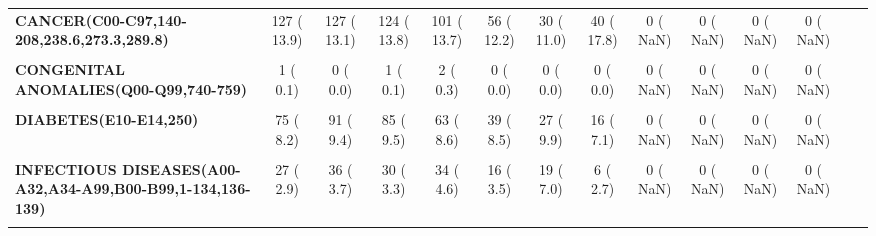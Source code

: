 \documentclass[
]{article}
\begin{document}
\begin{table}[H]
\begin{tabular}[t]{>{\raggedright\arraybackslash}p{5em}ccccccccccccc}
\textbf{CANCER(C00-C97,140-208,238.6,273.3,289.8)} & 127 ( 13.9) & 127 ( 13.1) & 124 ( 13.8) & 101 ( 13.7) & 56 ( 12.2) & 30 ( 11.0) & 40 ( 17.8) & 0 (  NaN) & 0 (  NaN) & 0 (  NaN) & 0 (  NaN) &  & \\
\textbf{\cellcolor{gray!10}{CHRONIC LIVER DIS(K70-K77,571)}} & \cellcolor{gray!10}{12 (  1.3)} & \cellcolor{gray!10}{7 (  0.7)} & \cellcolor{gray!10}{7 (  0.8)} & \cellcolor{gray!10}{3 (  0.4)} & \cellcolor{gray!10}{3 (  0.7)} & \cellcolor{gray!10}{4 (  1.5)} & \cellcolor{gray!10}{0 (  0.0)} & \cellcolor{gray!10}{0 (  NaN)} & \cellcolor{gray!10}{0 (  NaN)} & \cellcolor{gray!10}{0 (  NaN)} & \cellcolor{gray!10}{0 (  NaN)} & \cellcolor{gray!10}{} & \cellcolor{gray!10}{}\\
\textbf{CONGENITAL ANOMALIES(Q00-Q99,740-759)} & 1 (  0.1) & 0 (  0.0) & 1 (  0.1) & 2 (  0.3) & 0 (  0.0) & 0 (  0.0) & 0 (  0.0) & 0 (  NaN) & 0 (  NaN) & 0 (  NaN) & 0 (  NaN) &  & \\
\textbf{\cellcolor{gray!10}{COPD(J40-47,490-494,496)}} & \cellcolor{gray!10}{22 (  2.4)} & \cellcolor{gray!10}{16 (  1.7)} & \cellcolor{gray!10}{15 (  1.7)} & \cellcolor{gray!10}{17 (  2.3)} & \cellcolor{gray!10}{10 (  2.2)} & \cellcolor{gray!10}{3 (  1.1)} & \cellcolor{gray!10}{8 (  3.6)} & \cellcolor{gray!10}{0 (  NaN)} & \cellcolor{gray!10}{0 (  NaN)} & \cellcolor{gray!10}{0 (  NaN)} & \cellcolor{gray!10}{0 (  NaN)} & \cellcolor{gray!10}{} & \cellcolor{gray!10}{}\\
\textbf{DIABETES(E10-E14,250)} & 75 (  8.2) & 91 (  9.4) & 85 (  9.5) & 63 (  8.6) & 39 (  8.5) & 27 (  9.9) & 16 (  7.1) & 0 (  NaN) & 0 (  NaN) & 0 (  NaN) & 0 (  NaN) &  & \\
\textbf{\cellcolor{gray!10}{DISEASES OF THE CIRCULATORY SYSTEM (I00-I99)}} & \cellcolor{gray!10}{451 ( 49.2)} & \cellcolor{gray!10}{482 ( 49.7)} & \cellcolor{gray!10}{410 ( 45.6)} & \cellcolor{gray!10}{328 ( 44.6)} & \cellcolor{gray!10}{223 ( 48.7)} & \cellcolor{gray!10}{120 ( 44.0)} & \cellcolor{gray!10}{105 ( 46.7)} & \cellcolor{gray!10}{0 (  NaN)} & \cellcolor{gray!10}{0 (  NaN)} & \cellcolor{gray!10}{0 (  NaN)} & \cellcolor{gray!10}{0 (  NaN)} & \cellcolor{gray!10}{} & \cellcolor{gray!10}{}\\
\textbf{INFECTIOUS DISEASES(A00-A32,A34-A99,B00-B99,1-134,136-139)} & 27 (  2.9) & 36 (  3.7) & 30 (  3.3) & 34 (  4.6) & 16 (  3.5) & 19 (  7.0) & 6 (  2.7) & 0 (  NaN) & 0 (  NaN) & 0 (  NaN) & 0 (  NaN) &  & \\
\textbf{\cellcolor{gray!10}{INFLUENZA \& PNEUMONIA(J10-J18,480-487)}} & \cellcolor{gray!10}{20 (  2.2)} & \cellcolor{gray!10}{20 (  2.1)} & \cellcolor{gray!10}{13 (  1.4)} & \cellcolor{gray!10}{11 (  1.5)} & \cellcolor{gray!10}{5 (  1.1)} & \cellcolor{gray!10}{6 (  2.2)} & \cellcolor{gray!10}{2 (  0.9)} & \cellcolor{gray!10}{0 (  NaN)} & \cellcolor{gray!10}{0 (  NaN)} & \cellcolor{gray!10}{0 (  NaN)} & \cellcolor{gray!10}{0 (  NaN)} & \cellcolor{gray!10}{} & \cellcolor{gray!10}{}\\

\end{tabular}
\end{table}
\end{document}
